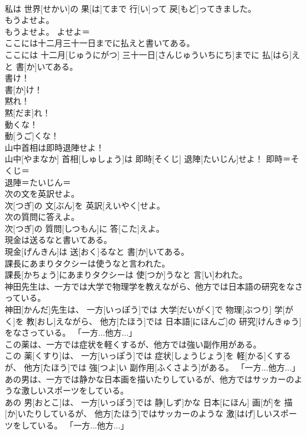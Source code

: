 \documentclass[8pt]{extreport}
\begin{document}
\begin{CJK}{UTF8}{min}
\\	私は 世界[せかい]の 果[は]てまで 行[い]って 戻[もど]ってきました。	
\\	もうよせよ。	
\\	もうよせよ。	よせよ＝ 
\\	ここには十二月三十一日までに払えと書いてある。	
\\	ここには 十二月[じゅうにがつ] 三十一日[さんじゅういちにち]までに 払[はら]えと 書[か]いてある。	
\\	書け！	
\\	書[か]け！	
\\	黙れ！	
\\	黙[だま]れ！	
\\	動くな！	
\\	動[うご]くな！	
\\	山中首相は即時退陣せよ！	
\\	山中[やまなか] 首相[しゅしょう]は 即時[そくじ] 退陣[たいじん]せよ！	即時＝そくじ＝ 
\\	退陣＝たいじん＝ 
\\	次の文を英訳せよ。	
\\	次[つぎ]の 文[ぶん]を 英訳[えいやく]せよ。	
\\	次の質問に答えよ。	
\\	次[つぎ]の 質問[しつもん]に 答[こた]えよ。	
\\	現金は送るなと書いてある。	
\\	現金[げんきん]は 送[おく]るなと 書[か]いてある。	
\\	課長にあまりタクシーは使うなと言われた。	
\\	課長[かちょう]にあまりタクシーは 使[つか]うなと 言[い]われた。	
\\	神田先生は、一方では大学で物理学を教えながら、他方では日本語の研究をなさっている。	
\\	神田[かんだ]先生は、 一方[いっぽう]では 大学[だいがく]で 物理[ぶつり] 学[がく]を 教[おし]えながら、 他方[たほう]では 日本語[にほんご]の 研究[けんきゅう]をなさっている。	「一方...他方...」
\\	この薬は、一方では症状を軽くするが、他方では強い副作用がある。	
\\	この 薬[くすり]は、 一方[いっぽう]では 症状[しょうじょう]を 軽[かる]くするが、 他方[たほう]では 強[つよ]い 副作用[ふくさよう]がある。	「一方...他方...」
\\	あの男は、一方では静かな日本画を描いたりしているが、他方ではサッカーのような激しいスポーツをしている。	
\\	あの 男[おとこ]は、 一方[いっぽう]では 静[しず]かな 日本[にほん] 画[が]を 描[か]いたりしているが、 他方[たほう]ではサッカーのような 激[はげ]しいスポーツをしている。	「一方...他方...」

\end{CJK}
\end{document}

